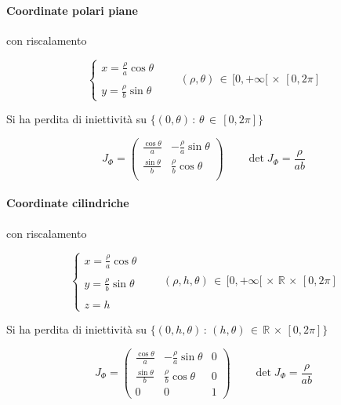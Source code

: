 \documentclass[10pt, oneside]{article}
\begin{document}
\paragraph{Coordinate polari piane} con riscalamento

\[\begin{cases} \displaystyle x = \frac{\rho}{a} \cos \theta \\ \\
\displaystyle y = \frac{\rho}{b} \sin \theta \end{cases}
\qquad (\rho, \theta) \, \in \, [0, +\infty[ \, \times \, [0, 2\pi] \]

Si ha perdita di iniettività su $\{(0, \theta) \, : \, \theta \, \in \, [0,2\pi]\}$

\[J_\Phi = \begin{pmatrix}
\displaystyle \frac{\cos \theta}{a} & \displaystyle - \frac{\rho}{a} \sin \theta \\
\displaystyle \frac{\sin \theta}{b} & \displaystyle \frac{\rho}{b} \cos \theta \\
\end{pmatrix} \qquad \det J_\Phi = \frac{\rho}{ab}\]

\paragraph{Coordinate cilindriche} con riscalamento

\[\begin{cases} \displaystyle x = \frac{\rho}{a} \cos \theta \\ \\
\displaystyle y = \frac{\rho}{b} \sin \theta \\ \\
\displaystyle z = h
\end{cases}
\qquad (\rho, h, \theta) \, \in \, [0, +\infty[ \, \times \, \mathbb{R} \, \times \, [0, 2\pi] \]

Si ha perdita di iniettività su $\{(0, h, \theta) \, : \, (h, \theta) \, \in \, \mathbb{R} \, \times \, [0,2\pi]\}$

\[J_\Phi = \begin{pmatrix}
\displaystyle \frac{\cos \theta}{a} & \displaystyle - \frac{\rho}{a} \sin \theta & \displaystyle 0\\
\displaystyle \frac{\sin \theta}{b} & \displaystyle \frac{\rho}{b} \cos \theta & \displaystyle 0\\
\displaystyle 0 & \displaystyle 0 & \displaystyle 1
\end{pmatrix} \qquad \det J_\Phi = \frac{\rho}{ab}\]
\end{document}
